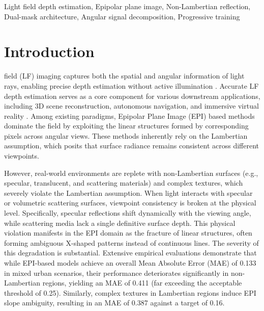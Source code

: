 \documentclass[lettersize,journal]{IEEEtran}
\begin{document}
\begin{IEEEkeywords}
Light field depth estimation, Epipolar plane image, Non-Lambertian reflection, Dual-mask architecture, Angular signal decomposition, Progressive training
\end{IEEEkeywords}

\section{Introduction}

 field (LF) imaging captures both the spatial and angular information of light rays, enabling precise depth estimation without active illumination \cite{he2016}. Accurate LF depth estimation serves as a core component for various downstream applications, including 3D scene reconstruction, autonomous navigation, and immersive virtual reality \cite{vaswani2017}. Among existing paradigms, Epipolar Plane Image (EPI) based methods dominate the field by exploiting the linear structures formed by corresponding pixels across angular views. These methods inherently rely on the Lambertian assumption, which posits that surface radiance remains consistent across different viewpoints.

However, real-world environments are replete with non-Lambertian surfaces (e.g., specular, translucent, and scattering materials) and complex textures, which severely violate the Lambertian assumption. When light interacts with specular or volumetric scattering surfaces, viewpoint consistency is broken at the physical level. Specifically, specular reflections shift dynamically with the viewing angle, while scattering media lack a single definitive surface depth. This physical violation manifests in the EPI domain as the fracture of linear structures, often forming ambiguous X-shaped patterns instead of continuous lines. The severity of this degradation is substantial. Extensive empirical evaluations demonstrate that while EPI-based models achieve an overall Mean Absolute Error (MAE) of 0.133 in mixed urban scenarios, their performance deteriorates significantly in non-Lambertian regions, yielding an MAE of 0.411 (far exceeding the acceptable threshold of 0.25). Similarly, complex textures in Lambertian regions induce EPI slope ambiguity, resulting in an MAE of 0.387 against a target of 0.16.
\end{document}
